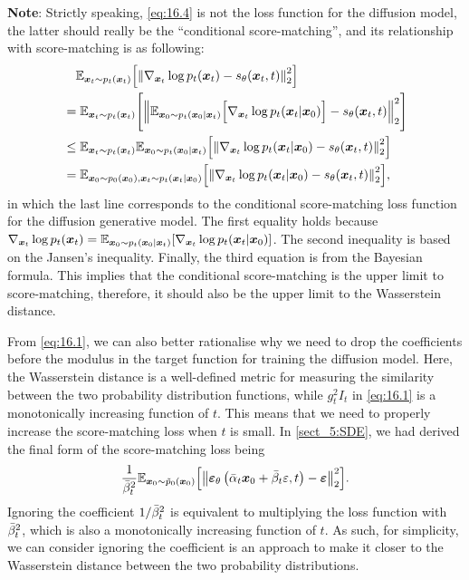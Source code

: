 \begin{myquote}
\textbf{Note}: Strictly speaking, \cref{eq:16.4} is not the loss function for the diffusion model, the latter should really be the ``conditional score-matching'', and its relationship with score-matching is as following:
\begin{align}
    &\quad \mathbb{E}_{\bm{x}_{t}\sim p_t(\bm{x}_{t})}\Bigl[\left\| \nabla_{\bm{x}_{t}}\log p_{t}(\bm{x}_{t})-s_{\theta}(\bm{x}_{t},t) \right\|_2^2 \Bigr]\nonumber\\
    &=\mathbb{E}_{\bm{x}_{t}\sim p_t(\bm{x}_{t})} \Biggl[ \left\| \mathbb{E}_{\bm{x}_0\sim p_t (\bm{x}_0|\bm{x}_t)} \Bigl[\nabla_{\bm{x}_{t}}\log p_t(\bm{x}_{t}|\bm{x}_0) \Bigr]- s_{\theta}(\bm{x}_{t},t) \right\|_2^2 \Biggr]\nonumber\\
    &\leq \mathbb{E}_{\bm{x}_{t}\sim p_t(\bm{x}_{t})} \mathbb{E}_{\bm{x}_0\sim p_t (\bm{x}_0|\bm{x}_t)} \Bigl[\left\| \nabla_{\bm{x}_{t}}\log p_{t}(\bm{x}_{t}|\bm{x}_0)-s_{\theta}(\bm{x}_{t},t) \right\|_2^2 \Bigr]\label{eq:16.5}\\
    &=\mathbb{E}_{\bm{x}_0\sim p_0(\bm{x}_0),\bm{x}_{t}\sim p_t(\bm{x}_{t}|\bm{x}_0)} \Bigl[\left\| \nabla_{\bm{x}_{t}}\log p_{t}(\bm{x}_{t}|\bm{x}_0)-s_{\theta}(\bm{x}_{t},t) \right\|_2^2 \Bigr],\nonumber
\end{align}
in which the last line corresponds to the conditional score-matching loss function for the diffusion generative model. The first equality holds because $\nabla_{\bm{x}_{t}}\log p_{t}(\bm{x}_{t})=\mathbb{E}_{\bm{x}_0\sim p_t (\bm{x}_0|\bm{x}_t)} [\nabla_{\bm{x}_{t}}\log p_t(\bm{x}_{t}|\bm{x}_0)]$. The second inequality is based on the Jansen's inequality. Finally, the third equation is from the Bayesian formula. This implies that the conditional score-matching is the upper limit to score-matching, therefore, it should also be the upper limit to the Wasserstein distance.
\end{myquote}

From \cref{eq:16.1}, we can also better rationalise why we need to drop the coefficients before the modulus in the target function for training the diffusion model. Here, the Wasserstein distance is a well-defined metric for measuring the similarity between the two probability distribution functions, while $g_t^2I_t$ in \cref{eq:16.1} is a monotonically increasing function of $t$. This means that we need to properly increase the score-matching loss when $t$ is small. In \cref{sect_5:SDE}, we had derived the final form of the score-matching loss being
\begin{equation}
    \label{eq:16.6}
    \frac{1}{\bar{\beta}_t^2}\mathbb{E}_{\bm{x}_0\sim\tilde{p}_0(\bm{x}_0)}\Bigl[\left\| \bm{\varepsilon}_\theta \left(\bar{\alpha}_t \bm{x}_0+\bar{\beta}_t\varepsilon,t\right)-\bm{\varepsilon} \right\|_2^2\Bigr].
\end{equation}
Ignoring the coefficient $1/\bar{\beta}_t^2$ is equivalent to multiplying the loss function with $\bar{\beta}_t^2$, which is also a monotonically increasing function of $t$. As such, for simplicity, we can consider ignoring the coefficient is an approach to make it closer to the Wasserstein distance between the two probability distributions.

